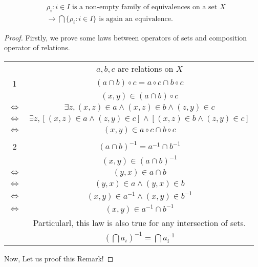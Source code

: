 \begin{Rmk}
    \begin{align*}
        &{\rho_i:i\in I} \text{ is a non-empty family of equivalences on a set } X   \\ 
        &\rightarrow \bigcap\{\rho_i:i\in I\}\text{ is again an equivalence.}
    \end{align*}
    \begin{proof}
        Firstly, we prove some laws between operators of sets and composition operator of relations.

        \begin{center}
        \begin{tabular}{c c}
            & $a,b,c$ are relations on $X$ \\
            1 & $(a\cap b)\circ c = a \circ c \cap b \circ c$    \\
            & $(x,y)\in (a \cap b)\circ c$  \\
            $\Leftrightarrow $ & $\exists z,(x,z)\in a \wedge (x,z) \in b \wedge (z,y)\in c$    \\
            $\Leftrightarrow $ & $\exists z, [(x,z)\in a \wedge (z,y)\in c] \wedge [(x,z)\in b \wedge (z,y)\in c]$  \\
            $\Leftrightarrow $ & $(x,y)\in a\circ c\cap b \circ c$  \\ 
            &   \\
            2 & $(a \cap b)^{-1}=a^{-1} \cap b^{-1}$    \\
            & $(x,y)\in (a\cap b)^{-1}$ \\
            $\Leftrightarrow $ & $(y,x) \in a \cap b$   \\
            $\Leftrightarrow $ & $(y,x) \in a \wedge (y,x) \in b$   \\
            $\Leftrightarrow $ & $(x,y) \in a^{-1} \wedge (x,y) \in b^{-1}$ \\
            $\Leftrightarrow $ & $(x,y) \in a^{-1} \cap b^{-1}$ \\
            & Particularl, this law is also true for any intersection of sets.  \\
            & $(\bigcap a_i)^{-1} = \bigcap a_i^{-1}$
        \end{tabular}
        \end{center}
        Now, Let us proof this Remark!


\end{proof}
\end{Rmk}
